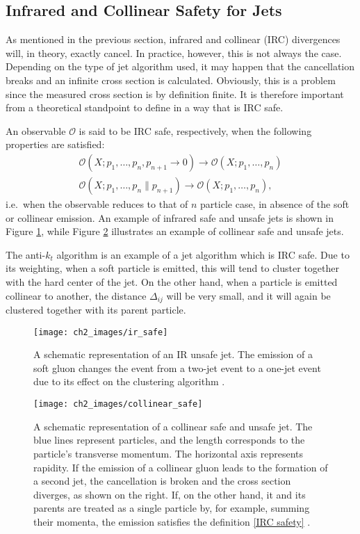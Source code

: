 \documentclass[10pt,a4paper]{book}
\begin{document}
\subsection{Infrared and Collinear Safety for Jets}
As mentioned in the previous section, infrared and collinear (IRC) divergences will, in theory, exactly cancel. In practice, however, this is not always the case. Depending on the type of jet algorithm used, it may happen that the cancellation breaks and an infinite cross section is calculated. Obviously, this is a problem since the measured cross section is by definition finite. It is therefore important from a theoretical standpoint to define in a way that is IRC safe. 

An observable $\mathcal{O}$ is said to be IRC safe, respectively, when the following properties are satisfied:
\begin{gather}
\mathcal{O}(X; p_1, \dots, p_n, p_{n+1} \rightarrow 0) \rightarrow  \mathcal{O}(X; p_1, \dots, p_n ) \label{IRC safety}\\
\mathcal{O}(X; p_1, \dots, p_n \parallel p_{n+1}) \rightarrow \mathcal{O}(X; p_1, \dots, p_n),
\end{gather}
i.e.\ when the observable reduces to that of $n$ particle case, in absence of the soft or collinear emission. An example of infrared safe and unsafe jets is shown in Figure \ref{Infrared safe jet}, while Figure \ref{collinear safe jet} illustrates an example of collinear safe and unsafe jets.

The anti-$k_t$ algorithm is an example of a jet algorithm which is IRC safe. Due to its weighting, when a soft particle is emitted, this will tend to cluster together with the hard center of the jet. On the other hand, when a particle is emitted collinear to another, the distance $\Delta_{ij}$ will be very small, and it will again be clustered together with its parent particle.


\begin{figure}[h!]
\centering
\texttt{[image: ch2\_images/ir\_safe]}
\caption{A schematic representation of an IR unsafe jet. The emission of a soft gluon changes the event from a two-jet event to a one-jet event due to its effect on the clustering algorithm \cite{Salam:2010nqg}.}
\label{Infrared safe jet}
\end{figure}

\begin{figure}[h!]
\centering
\texttt{[image: ch2\_images/collinear\_safe]}
\caption{A schematic representation of a collinear safe and unsafe jet. The blue lines represent particles, and the length corresponds to the particle's transverse momentum. The horizontal axis represents rapidity. If the emission of a collinear gluon leads to the formation of a second jet, the cancellation is broken and the cross section diverges, as shown on the right. If, on the other hand, it and its parents are treated as a single particle by, for example, summing their momenta, the emission satisfies the definition \ref{IRC safety} \cite{Salam:2010nqg}.}
\label{collinear safe jet}
\end{figure}
\end{document}
